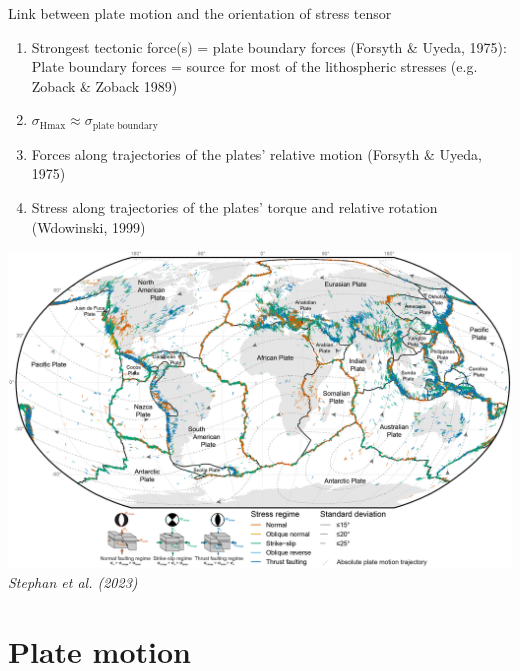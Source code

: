 \documentclass[10pt,xcolor=dvipsnames, aspectratio=169]{beamer}
\begin{document}
 \begin{frame}{Link between plate motion and the orientation of stress tensor}
 \begin{minipage}{.4\linewidth}
 \small
  \begin{enumerate}[<+->]
    \item Strongest tectonic force(s) = plate boundary forces (Forsyth \& Uyeda, 1975): Plate boundary forces = source for most of the lithospheric stresses (e.g. Zoback \& Zoback 1989)
    \item $\sigma_\text{Hmax} \approx \sigma_\text{plate boundary}$
    \item Forces along trajectories of the plates’ relative motion (Forsyth \& Uyeda, 1975)
    \item Stress along trajectories of the plates’ torque and relative rotation (Wdowinski, 1999)
  \end{enumerate}
  \end{minipage}
  \hfill
  \begin{minipage}{.58\linewidth}
      \includegraphics[width=\linewidth]{Figure_13_stress_world.png}
      \tiny\textit{Stephan et al. (2023)}
  \end{minipage}  
\end{frame}

  
\section{Plate motion}
\end{document}
